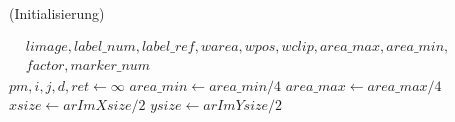 \begin{algorithm}[!ht]
\caption{ (Initialisierung)}
\label{alg:detectmarker2-1}
\begin{algorithmic}[1]
	\Require $
	\begin{aligned}
		& \mathit{limage}, \mathit{label\_num}, \mathit{label\_ref}, \mathit{warea}, \mathit{wpos}, \mathit{wclip}, \mathit{area\_max}, \mathit{area\_min},\\
		& \mathit{factor}, \mathit{marker\_num}
	\end{aligned}$
	\State $\mathit{pm}, i, j, d, \mathit{ret} \gets \infty$
	\State $\mathit{area\_min} \gets \mathit{area\_min} / 4$
	\State $\mathit{area\_max} \gets \mathit{area\_max} / 4$
	\State $\mathit{xsize} \gets \mathit{arImXsize} / 2$
	\State $\mathit{ysize} \gets \mathit{arImYsize} / 2$
\end{algorithmic}
\end{algorithm}
